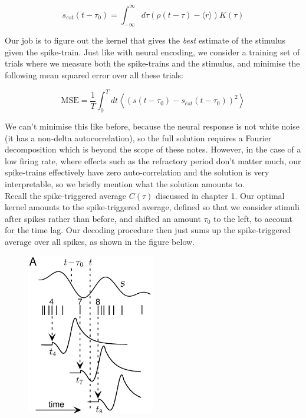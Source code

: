 \documentclass{article}
\begin{document}
\begin{equation*}
	s_{est}(t-\tau_0) = \int_{-\infty}^\infty d\tau (\rho(t-\tau)-\langle r \rangle)K(\tau)
\end{equation*}

Our job is to figure out the kernel that gives the \textit{best} estimate of the stimulus given the spike-train. Just like with neural encoding, we consider a training set of trials where we measure both the spike-trains and the stimulus, and minimise the following mean squared error over all these trials:

\begin{equation*}
	\text{MSE} = \frac{1}{T}\int_0^T dt \left\langle \left ( s(t-\tau_0) - s_{est}(t-\tau_0) \right)^2\right\rangle
\end{equation*}

We can't minimise this like before, because the neural response is not white noise (it has a non-delta autocorrelation), so the full solution requires a Fourier decomposition which is beyond the scope of these notes. However, in the case of a low firing rate, where effects such as the refractory period don't matter much, our spike-trains effectively have zero auto-correlation and the solution is very interpretable, so we briefly mention what the solution amounts to.\\

Recall the spike-triggered average $C(\tau)$ discussed in chapter 1. Our optimal kernel amounts to the spike-triggered average, defined so that we consider stimuli after spikes rather than before, and shifted an amount $\tau_0$ to the left, to account for the time lag. Our decoding procedure then just sums up the spike-triggered average over all spikes, as shown in the figure below.\\

\begin{figure}[h]
	\centering
	\includegraphics[width=0.5\textwidth]{decoding.png} %
	\label{fig:example_png}
\end{figure}
\end{document}
